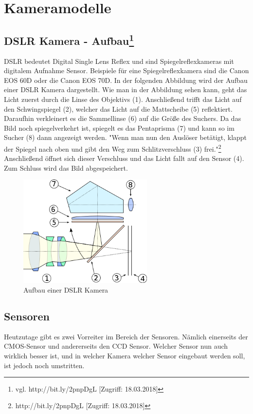 \section{Kameramodelle}
\subsection[DSLR Kamera - Aufbau]{DSLR Kamera - Aufbau\protect\footnote{\label{}vgl. http://bit.ly/2pnpDgL [Zugriff: 18.03.2018]}}
DSLR bedeutet Digital Single Lens Reflex und sind Spiegelreflexkameras mit digitalem Aufnahme Sensor. Beispiele für eine Spiegelreflexkamera sind die Canon EOS 60D oder die Canon EOS 70D. In der folgenden Abbildung wird der Aufbau einer DSLR Kamera dargestellt. Wie man in der Abbildung sehen kann, geht das Licht zuerst durch die Linse des Objektivs (1). Anschließend trifft das Licht auf den Schwingspiegel (2), welcher das Licht auf die Mattscheibe (5) reflektiert. Daraufhin verkleinert es die Sammellinse (6) auf die Größe des Suchers. Da das Bild noch spiegelverkehrt ist, spiegelt es das Pentaprisma (7) und kann so im Sucher (8) dann angezeigt werden. "Wenn man nun den Auslöser betätigt, klappt der Spiegel nach oben und gibt den Weg zum Schlitzverschluss (3) frei."\footnote{\label{}http://bit.ly/2pnpDgL [Zugriff: 18.03.2018]} Anschließend öffnet sich dieser Verschluss und das Licht fallt auf den Sensor (4). Zum Schluss wird das Bild abgespeichert.
\begin{figure}[H]
	\centering
	\includegraphics[width=0.6\textwidth]{abb13} 
	\caption{Aufbau einer DSLR Kamera}
\end{figure}
\subsection{Sensoren}
Heutzutage gibt es zwei Vorreiter im Bereich der Sensoren. Nämlich einerseits der CMOS-Sensor und andererseits den CCD Sensor. Welcher Sensor nun auch wirklich besser ist, und in welcher Kamera welcher Sensor eingebaut werden soll, ist jedoch noch umstritten.
